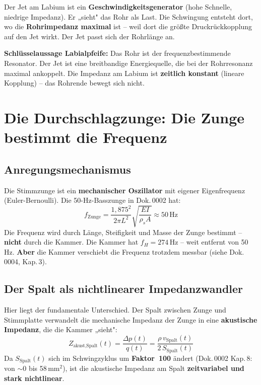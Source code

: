 \documentclass[11pt,a4paper]{article}
\begin{document}
Der Jet am Labium ist ein \textbf{Geschwindigkeitsgenerator} (hohe Schnelle, niedrige Impedanz). Er „sieht" das Rohr als Last. Die Schwingung entsteht dort, wo die \textbf{Rohrimpedanz maximal} ist -- weil dort die größte Druckrückkopplung auf den Jet wirkt. Der Jet passt sich der Rohrlänge an.

\begin{keybox}
\textbf{Schlüsselaussage Labialpfeife:} Das Rohr ist der frequenzbestimmende Resonator. Der Jet ist eine breitbandige Energiequelle, die bei der Rohrresonanz maximal ankoppelt. Die Impedanz am Labium ist \textbf{zeitlich konstant} (lineare Kopplung) -- das Rohrende bewegt sich nicht.
\end{keybox}

\section{Die Durchschlagzunge: Die Zunge bestimmt die Frequenz}

\subsection{Anregungsmechanismus}

Die Stimmzunge ist ein \textbf{mechanischer Oszillator} mit eigener Eigenfrequenz (Euler-Bernoulli). Die 50-Hz-Basszunge in Dok.\,0002 hat:
\begin{equation}
f_\text{Zunge} = \frac{1{,}875^2}{2\pi L^2} \sqrt{\frac{EI}{\rho_s A}} \approx 50\,\text{Hz}
\end{equation}
Die Frequenz wird durch Länge, Steifigkeit und Masse der Zunge bestimmt -- \textbf{nicht} durch die Kammer. Die Kammer hat $f_H = 274$\,Hz -- weit entfernt von 50\,Hz. \textbf{Aber} die Kammer verschiebt die Frequenz trotzdem messbar (siehe Dok.\,0004, Kap.\,3).

\subsection{Der Spalt als nichtlinearer Impedanzwandler}

Hier liegt der fundamentale Unterschied. Der Spalt zwischen Zunge und Stimmplatte verwandelt die mechanische Impedanz der Zunge in eine \textbf{akustische Impedanz}, die die Kammer „sieht":
\begin{equation}
Z_\text{akust,Spalt}(t) = \frac{\Delta p(t)}{q(t)} = \frac{\rho\, v_\text{Spalt}(t)}{2\, S_\text{Spalt}(t)}
\end{equation}
Da $S_\text{Spalt}(t)$ sich im Schwingzyklus um \textbf{Faktor~100} ändert (Dok.\,0002 Kap.\,8: von $\sim 0$ bis 58\,mm$^2$), ist die akustische Impedanz am Spalt \textbf{zeitvariabel und stark nichtlinear}.
\end{document}
